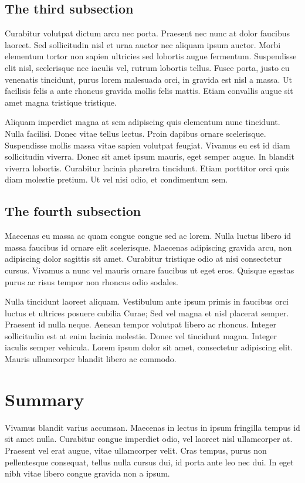 \subsection{The third subsection}
\label{ch2:second:c}
Curabitur volutpat dictum arcu nec porta. Praesent nec nunc at dolor faucibus laoreet. Sed sollicitudin nisl et urna auctor nec aliquam ipsum auctor. Morbi elementum tortor non sapien ultricies sed lobortis augue fermentum. Suspendisse elit nisl, scelerisque nec iaculis vel, rutrum lobortis tellus. Fusce porta, justo eu venenatis tincidunt, purus lorem malesuada orci, in gravida est nisl a massa. Ut facilisis felis a ante rhoncus gravida mollis felis mattis. Etiam convallis augue sit amet magna tristique tristique. 

Aliquam imperdiet magna at sem adipiscing quis elementum nunc tincidunt. Nulla facilisi. Donec vitae tellus lectus. Proin dapibus ornare scelerisque. Suspendisse mollis massa vitae sapien volutpat feugiat. Vivamus eu est id diam sollicitudin viverra. Donec sit amet ipsum mauris, eget semper augue. In blandit viverra lobortis. Curabitur lacinia pharetra tincidunt. Etiam porttitor orci quis diam molestie pretium. Ut vel nisi odio, et condimentum sem.

\subsection{The fourth subsection}
\label{ch2:second:d}
Maecenas eu massa ac quam congue congue sed ac lorem. Nulla luctus libero id massa faucibus id ornare elit scelerisque. Maecenas adipiscing gravida arcu, non adipiscing dolor sagittis sit amet. Curabitur tristique odio at nisi consectetur cursus. Vivamus a nunc vel mauris ornare faucibus ut eget eros. Quisque egestas purus ac risus tempor non rhoncus odio sodales. 

Nulla tincidunt laoreet aliquam. Vestibulum ante ipsum primis in faucibus orci luctus et ultrices posuere cubilia Curae; Sed vel magna et nisl placerat semper. Praesent id nulla neque. Aenean tempor volutpat libero ac rhoncus. Integer sollicitudin est at enim lacinia molestie. Donec vel tincidunt magna. Integer iaculis semper vehicula. Lorem ipsum dolor sit amet, consectetur adipiscing elit. Mauris ullamcorper blandit libero ac commodo.


\section{Summary}
\label{ch2:summary}
Vivamus blandit varius accumsan. Maecenas in lectus in ipsum fringilla tempus id sit amet nulla. Curabitur congue imperdiet odio, vel laoreet nisl ullamcorper at. Praesent vel erat augue, vitae ullamcorper velit. Cras tempus, purus non pellentesque consequat, tellus nulla cursus dui, id porta ante leo nec dui. In eget nibh vitae libero congue gravida non a ipsum. 


